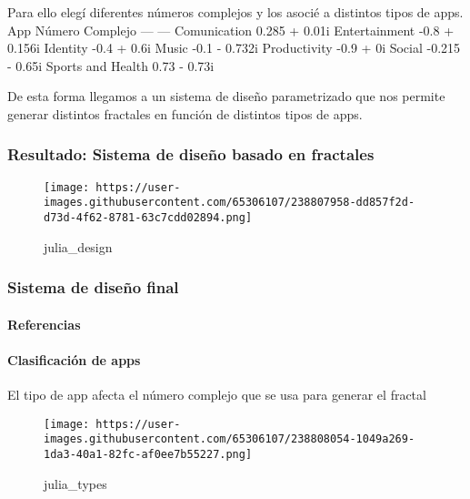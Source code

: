 \documentclass[
]{article}
\begin{document}
Para ello elegí diferentes números complejos y los asocié a distintos
tipos de apps.\\
\textbar{} App \textbar{} Número Complejo \textbar{} \textbar{} ---
\textbar{} --- \textbar{} \textbar{} Comunication \textbar{} 0.285 +
0.01i \textbar{} \textbar{} Entertainment \textbar{} -0.8 + 0.156i
\textbar{} \textbar{} Identity \textbar{} -0.4 + 0.6i \textbar{}
\textbar{} Music \textbar{} -0.1 - 0.732i \textbar{} \textbar{}
Productivity \textbar{} -0.9 + 0i \textbar{} \textbar{} Social
\textbar{} -0.215 - 0.65i \textbar{} \textbar{} Sports and Health
\textbar{} 0.73 - 0.73i \textbar{}

De esta forma llegamos a un sistema de diseño parametrizado que nos
permite generar distintos fractales en función de distintos tipos de
apps.

\hypertarget{resultado-sistema-de-diseuxf1o-basado-en-fractales}{%
\subsubsection{Resultado: Sistema de diseño basado en
fractales}\label{resultado-sistema-de-diseuxf1o-basado-en-fractales}}

\begin{figure}
\centering
\texttt{[image: https://user-images.githubusercontent.com/65306107/238807958-dd857f2d-d73d-4f62-8781-63c7cdd02894.png]}
\caption{julia\_design}
\end{figure}

\hypertarget{sistema-de-diseuxf1o-final}{%
\subsubsection{Sistema de diseño
final}\label{sistema-de-diseuxf1o-final}}

\hypertarget{referencias}{%
\paragraph{Referencias}\label{referencias}}

\hypertarget{clasificaciuxf3n-de-apps}{%
\paragraph{Clasificación de apps}\label{clasificaciuxf3n-de-apps}}

El tipo de app afecta el número complejo que se usa para generar el
fractal

\begin{figure}
\centering
\texttt{[image: https://user-images.githubusercontent.com/65306107/238808054-1049a269-1da3-40a1-82fc-af0ee7b55227.png]}
\caption{julia\_types}
\end{figure}
\end{document}
